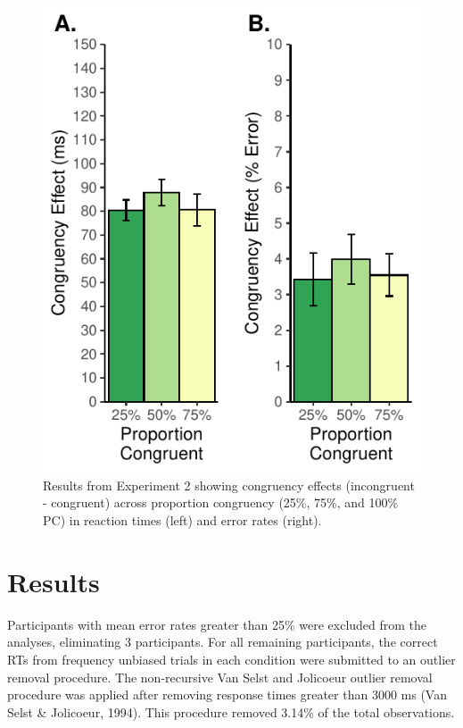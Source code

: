 \documentclass[english,,man,floatsintext]{apa6}
\begin{document}
\begin{figure}
\centering
\includegraphics{manuscript_pretty_files/figure-latex/figure3-1.pdf}
\caption{\label{fig:figure3}Results from Experiment 2 showing congruency effects (incongruent - congruent) across proportion congruency (25\%, 75\%, and 100\% PC) in reaction times (left) and error rates (right).}
\end{figure}



\hypertarget{results-1}{%
\section{Results}\label{results-1}}

Participants with mean error rates greater than 25\% were excluded from the analyses, eliminating 3 participants. For all remaining participants, the correct RTs from frequency unbiased trials in each condition were submitted to an outlier removal procedure. The non-recursive Van Selst and Jolicoeur outlier removal procedure was applied after removing response times greater than 3000 ms (Van Selst \& Jolicoeur, 1994). This procedure removed 3.14\% of the total observations.
\end{document}
